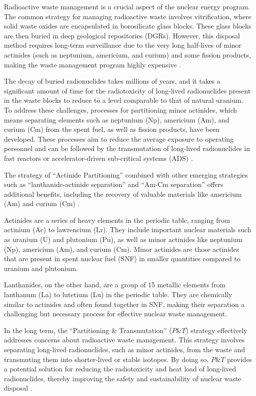 Radioactive waste management is a crucial aspect of the nuclear energy program. The common strategy for managing radioactive waste involves vitrification, where solid waste oxides are encapsulated in borosilicate glass blocks. These glass blocks are then buried in deep geological repositories (DGRs). However, this disposal method requires long-term surveillance due to the very long half-lives of minor actinides (such as neptunium, americium, and curium) and some fission products, making the waste management program highly expensive \cite{fuel_cycle_book}.

The decay of buried radionuclides takes millions of years, and it takes a significant amount of time for the radiotoxicity of long-lived radionuclides present in the waste blocks to reduce to a level comparable to that of natural uranium\cite{fuel_cycle_book}. To address these challenges, processes for partitioning minor actinides, which means separating elements such as neptunium (Np), americium (Am), and curium (Cm) from the spent fuel, as well as fission products, have been developed. These processes aim to reduce the average exposure to operating personnel and can be followed by the transmutation of long-lived radionuclides in fast reactors or accelerator-driven sub-critical systems (ADS) \cite{fuel_cycle_book}.

The strategy of ``Actinide Partitioning'' combined with other emerging strategies such as ``lanthanide-actinide separation'' and ``Am-Cm separation'' offers additional benefits, including the recovery of valuable materials like americium (Am) and curium (Cm) \cite{fuel_cycle_book}.

Actinides are a series of heavy elements in the periodic table, ranging from actinium (Ac) to lawrencium (Lr). They include important nuclear materials such as uranium (U) and plutonium (Pu), as well as minor actinides like neptunium (Np), americium (Am), and curium (Cm). Minor actinides are those actinides that are present in spent nuclear fuel (SNF) in smaller quantities compared to uranium and plutonium.

Lanthanides, on the other hand, are a group of 15 metallic elements from lanthanum (La) to lutetium (Lu) in the periodic table. They are chemically similar to actinides and often found together in SNF, making their separation a challenging but necessary process for effective nuclear waste management.

In the long term, the ``Partitioning \& Transmutation'' (\(P\&T\)) strategy effectively addresses concerns about radioactive waste management. This strategy involves separating long-lived radionuclides, such as minor actinides, from the waste and transmuting them into shorter-lived or stable isotopes. By doing so, \(P\&T\) provides a potential solution for reducing the radiotoxicity and heat load of long-lived radionuclides, thereby improving the safety and sustainability of nuclear waste disposal \cite{fuel_cycle_book}.

